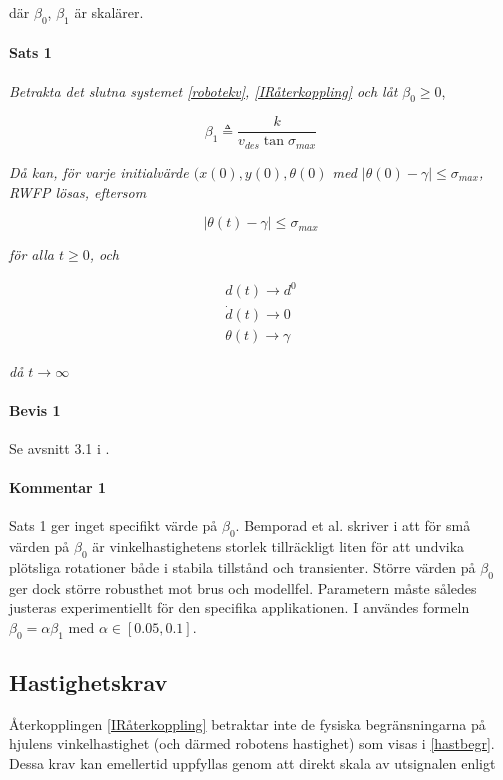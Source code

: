 \documentclass[11pt]{article}
\begin{document}
\begin{flushleft}
där $\beta_0$, $\beta_1$ är skalärer.
	
\paragraph{Sats 1} \textit{Betrakta det slutna systemet \eqref{robotekv}, \eqref{IRåterkoppling} och låt} $\beta_0 \geq 0$,

\begin{equation}
	\beta_1 \triangleq \frac {k} {v_{des} \tan \sigma_{max}}
\end{equation}

\textit{Då kan, för varje initialvärde $(x(0), y(0), \theta(0)$ med $| \theta(0) - \gamma| \leq \sigma_{max}$,  RWFP lösas, eftersom}

\begin{equation}
	| \theta(t) - \gamma| \leq \sigma_{max}
\end{equation}

\textit{för alla $t \geq 0$, och}

\begin{equation}
\begin{aligned}
	d(t) \to d^0 \\
	\dot{d}(t) \to 0 \\ 
	\theta(t) \to \gamma 
\end{aligned}
\end{equation}

\textit{då $t \to \infty$}

\paragraph{Bevis 1} Se avsnitt 3.1 i \cite{wfp}.

\paragraph{Kommentar 1} Sats 1 ger inget specifikt värde på $\beta_0$. Bemporad et al. skriver i \cite{wfp} att för små värden på $\beta_0$ är vinkelhastighetens storlek tillräckligt liten för att undvika plötsliga rotationer både i stabila tillstånd och transienter. Större värden på $\beta_0$ ger dock större robusthet mot brus och modellfel. Parametern måste således justeras experimentiellt för den specifika applikationen. I \cite{wfp} användes formeln $\beta_0 = \alpha \beta_1$ med $\alpha \in [0.05,0.1]$.

\subsection{Hastighetskrav}
Återkopplingen \eqref{IRåterkoppling} betraktar inte de fysiska begränsningarna på hjulens vinkelhastighet (och därmed robotens hastighet) som visas i \eqref{hastbegr}. Dessa krav kan emellertid uppfyllas genom att direkt skala av utsignalen enligt


\end{flushleft}
\end{document}
